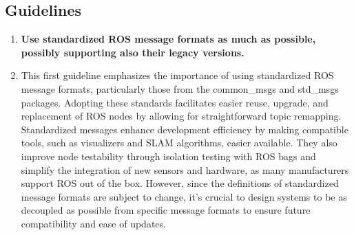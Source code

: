 \documentclass[%
paper=A4,               %
twoside=true,           %
openright,              %
11pt,                   %
bibliography=totoc,     %
titlepage=on,           %
DIV=12,                 %
BCOR=1.5cm,             %
parskip=half,            %
final
]{scrreprt}
\begin{document}
	\subsection{Guidelines}
	\label{subsec:Guidelines}
	\begin{enumerate}[leftmargin=9mm, align=left]
		\item \textbf{Use standardized ROS message formats as much as possible, possibly supporting also their legacy versions.} 
		\item[]This first guideline emphasizes the importance of using standardized ROS message formats, particularly those from the common\_msgs and std\_msgs packages. Adopting these standards facilitates easier reuse, upgrade, and replacement of ROS nodes by allowing for straightforward topic remapping. Standardized messages enhance development efficiency by making compatible tools, such as visualizers and SLAM algorithms, easier available. They also improve node testability through isolation testing with ROS bags and simplify the integration of new sensors and hardware, as many manufacturers support ROS out of the box. However, since the definitions of standardized message formats are subject to change, it's crucial to design systems to be as decoupled as possible from specific message formats to ensure future compatibility and ease of updates. \autocite{malavoltaHowYouArchitect2020}
		

\end{enumerate}
\end{document}
